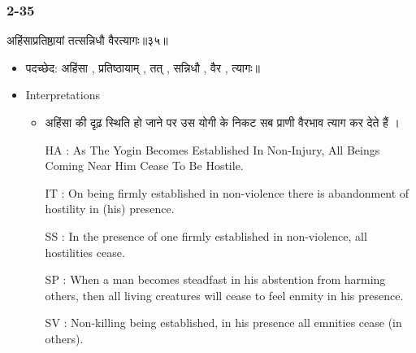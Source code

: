 \begin{frame}[fragile]\frametitle{2-35}
\begin{sanskrit}
अहिंसाप्रतिष्ठायां तत्सन्निधौ वैरत्यागः॥३५॥
\end{sanskrit}

	\begin{itemize}
	\item पदच्छेद: अहिंसा , प्रतिष्ठायाम् , तत् , सन्निधौ , वैर , त्यागः॥
	\item Interpretations
		\begin{itemize}
		\item अहिंसा की दृढ़ स्थिति हो जाने पर उस योगी के निकट सब प्राणी वैरभाव त्याग कर देते हैं ।
		\item [HA]: As The Yogin Becomes Established In Non-Injury, All Beings Coming Near Him Cease To Be Hostile.
		\item [IT]: On being firmly established in non-violence there is abandonment of hostility in (his) presence.
		\item [SS]: In the presence of one firmly established in non-violence, all hostilities cease.
		\item [SP]: When a man becomes steadfast in his abstention from harming others, then all living creatures will cease to feel enmity in his presence.
		\item [SV]: Non-killing being established, in his presence all emnities cease (in others). 
		\end{itemize}
	\end{itemize}	
\end{frame}


